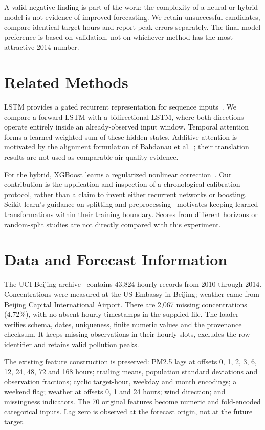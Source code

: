 \documentclass[conference]{IEEEtran}
\begin{document}
A valid negative finding is part of the work: the complexity of a neural or hybrid model is not evidence of improved forecasting. We retain unsuccessful candidates, compare identical target hours and report peak errors separately. The final model preference is based on validation, not on whichever method has the most attractive 2014 number.

\section{Related Methods}
LSTM provides a gated recurrent representation for sequence inputs~\cite{pytorch}. We compare a forward LSTM with a bidirectional LSTM, where both directions operate entirely inside an already-observed input window. Temporal attention forms a learned weighted sum of these hidden states. Additive attention is motivated by the alignment formulation of Bahdanau et al.~\cite{attention}; their translation results are not used as comparable air-quality evidence.

For the hybrid, XGBoost learns a regularized nonlinear correction~\cite{xgboost}. Our contribution is the application and inspection of a chronological calibration protocol, rather than a claim to invent either recurrent networks or boosting. Scikit-learn's guidance on splitting and preprocessing~\cite{sklearn} motivates keeping learned transformations within their training boundary. Scores from different horizons or random-split studies are not directly compared with this experiment.

\section{Data and Forecast Information}
The UCI Beijing archive~\cite{uci} contains 43,824 hourly records from 2010 through 2014. Concentrations were measured at the US Embassy in Beijing; weather came from Beijing Capital International Airport. There are 2,067 missing concentrations (4.72\%), with no absent hourly timestamps in the supplied file. The loader verifies schema, dates, uniqueness, finite numeric values and the provenance checksum. It keeps missing observations in their hourly slots, excludes the row identifier and retains valid pollution peaks.

The existing feature construction is preserved: PM2.5 lags at offsets 0, 1, 2, 3, 6, 12, 24, 48, 72 and 168 hours; trailing means, population standard deviations and observation fractions; cyclic target-hour, weekday and month encodings; a weekend flag; weather at offsets 0, 1 and 24 hours; wind direction; and missingness indicators. The 70 original features become numeric and fold-encoded categorical inputs. Lag zero is observed at the forecast origin, not at the future target.
\end{document}
